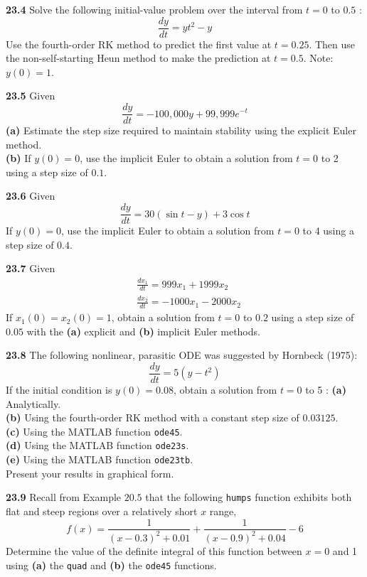 \documentclass[../main.tex]{subfiles}
\begin{document}
\begin{multicols}{2}
    \noindent \textbf{23.4} Solve the following initial-value problem over the interval from $t=0$ to $0.5$ :
    $$
    \frac{d y}{d t}=y t^{2}-y
    $$
    Use the fourth-order RK method to predict the first value at $t=0.25$. Then use the non-self-starting Heun method to make the prediction at $t=0.5$. Note: $y(0)=1$.\vspace{2mm}

    \noindent \textbf{23.5} Given
    $$
    \frac{d y}{d t}=-100,000 y+99,999 e^{-t}
    $$
    \textbf{(a)} Estimate the step size required to maintain stability using the explicit Euler method.\\
    \textbf{(b)} If $y(0)=0$, use the implicit Euler to obtain a solution from $t=0$ to 2 using a step size of $0.  1$.\vspace{2mm}

    \noindent \textbf{23.6} Given
    $$
    \frac{d y}{d t}=30(\sin t-y)+3 \cos t
    $$
    If $y(0)=0$, use the implicit Euler to obtain a solution from $t=0$ to 4 using a step size of $0.4$.\vspace {2mm}

    \noindent \textbf{23.7} Given
    $$
    \begin{aligned}
    &\frac{d x_{1}}{d t}=999 x_{1}+1999 x_{2} \\
    &\frac{d x_{2}}{d t}=-1000 x_{1}-2000 x_{2}
    \end{aligned}
    $$
    If $x_{1}(0)=x_{2}(0)=1$, obtain a solution from $t=0$ to $0.2$ using a step size of $0.05$ with the \textbf{   (a)} explicit and \textbf{(b)} implicit Euler methods.\vspace{2mm}

    \noindent \textbf{23.8} The following nonlinear, parasitic ODE was suggested by Hornbeck (1975):
    $$
    \frac{d y}{d t}=5\left(y-t^{2}\right)
    $$
    If the initial condition is $y(0)=0.08$, obtain a solution from $t=0$ to 5 :
    \textbf{(a)} Analytically.\\
    \textbf{(b)} Using the fourth-order RK method with a constant step size of $0.03125$.\\
    \textbf{(c)} Using the MATLAB function \texttt{ode45}.\\
    \textbf{(d)} Using the MATLAB function \texttt{ode23s}.\\
    \textbf{(e)} Using the MATLAB function \texttt{ode23tb}.\\
    Present your results in graphical form.\vspace{2mm}

    \noindent \textbf{23.9} Recall from Example $20.5$ that the following \texttt{humps} function exhibits both     flat and steep regions over a relatively short $x$ range,
    $$
    f(x)=\frac{1}{(x-0.3)^{2}+0.01}+\frac{1}{(x-0.9)^{2}+0.04}-6
    $$
    Determine the value of the definite integral of this function between $x=0$ and 1 using \textbf{(a)} the \texttt{quad} and \textbf{(b)} the \texttt{ode45} functions.\vspace{2mm}


\end{multicols}
\end{document}
